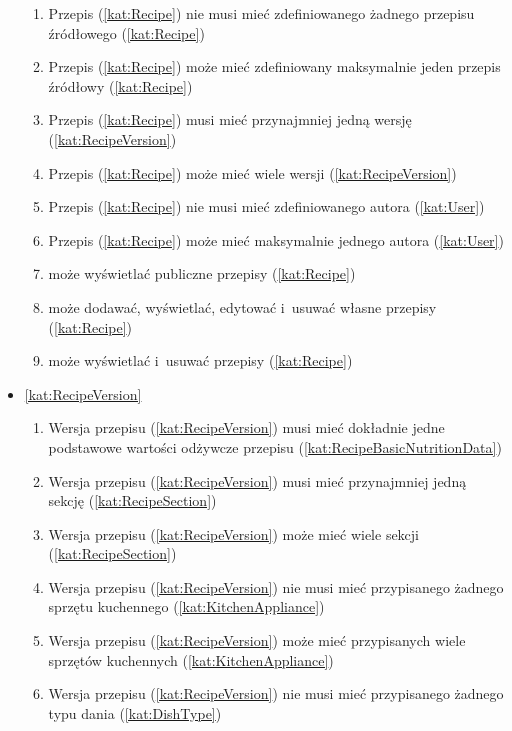 \begin{itemize}[label={\textbf{Reguły dla}}, wide, labelwidth=!, labelindent=0pt]
\begin{enumerate}[label={\textbf{REG/\protect\threedigits{\arabic{enumi}}}}, wide, labelwidth=!, align=left, leftmargin=3cm, resume]
        \item Przepis (\ref{kat:Recipe}) nie musi mieć zdefiniowanego żadnego przepisu źródłowego (\ref{kat:Recipe})
        \item Przepis (\ref{kat:Recipe}) może mieć zdefiniowany maksymalnie jeden przepis źródłowy (\ref{kat:Recipe})
        \item Przepis (\ref{kat:Recipe}) musi mieć przynajmniej jedną wersję (\ref{kat:RecipeVersion})
        \item Przepis (\ref{kat:Recipe}) może mieć wiele wersji (\ref{kat:RecipeVersion})
        \item Przepis (\ref{kat:Recipe}) nie musi mieć zdefiniowanego autora (\ref{kat:User})
        \item Przepis (\ref{kat:Recipe}) może mieć maksymalnie jednego autora (\ref{kat:User})
        \item {} może wyświetlać publiczne przepisy (\ref{kat:Recipe})
        \item {} może dodawać, wyświetlać, edytować i~usuwać własne przepisy (\ref{kat:Recipe})
        \item {} może wyświetlać i~usuwać przepisy (\ref{kat:Recipe})
    \end{enumerate}
    \item\ref{kat:RecipeVersion}
    \begin{enumerate}[label={\textbf{REG/\protect\threedigits{\arabic{enumi}}}}, wide, labelwidth=!, align=left, leftmargin=3cm, resume]
        \item Wersja przepisu (\ref{kat:RecipeVersion}) musi mieć dokładnie jedne podstawowe wartości odżywcze przepisu (\ref{kat:RecipeBasicNutritionData})
        \item Wersja przepisu (\ref{kat:RecipeVersion}) musi mieć przynajmniej jedną sekcję (\ref{kat:RecipeSection})
        \item Wersja przepisu (\ref{kat:RecipeVersion}) może mieć wiele sekcji (\ref{kat:RecipeSection})
        \item Wersja przepisu (\ref{kat:RecipeVersion}) nie musi mieć przypisanego żadnego sprzętu kuchennego (\ref{kat:KitchenAppliance})
        \item Wersja przepisu (\ref{kat:RecipeVersion}) może mieć przypisanych wiele sprzętów kuchennych (\ref{kat:KitchenAppliance})
        \item Wersja przepisu (\ref{kat:RecipeVersion}) nie musi mieć przypisanego żadnego typu dania (\ref{kat:DishType})

\end{enumerate}
\end{itemize}
